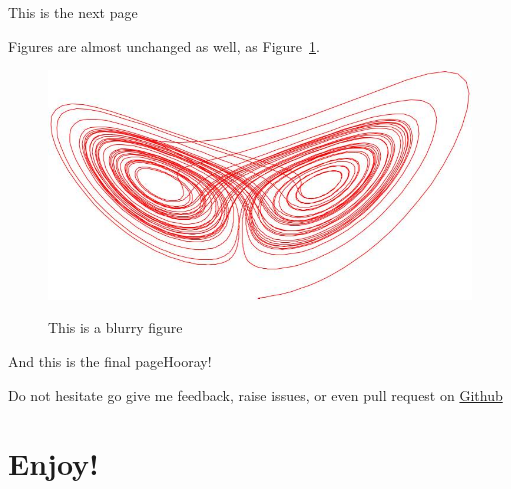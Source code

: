 \documentclass[serif,c,10pt]{beamer}
\begin{document}
\begin{frame}{This is the next page}\label{frame:next-page}
	
	Figures are almost unchanged as well, as Figure~\ref{fig:a-nice-figure}.
	
	\begin{figure}
		\includegraphics[scale=0.25]{lorenz.jpg}\\
		\caption{This is a blurry figure}
		\label{fig:a-nice-figure}
	\end{figure}

	\hyperlink{frame:previous-page}{}  \hfill 	\hyperlink{frame:final-page}{} 
	
\end{frame}

\begin{frame}{And this is the final page}{Hooray!}\label{frame:final-page}
	
	Do not hesitate go give me feedback, raise issues, or even pull request on \href{}{Github}
	
\end{frame}

\section{Enjoy!}
\end{document}
